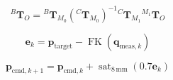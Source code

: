 \documentclass{article}
\begin{document}
\[
{}^{B}\mathbf{T}_{O} = {}^{B}\mathbf{T}_{M_0}\left({}^{C}\mathbf{T}_{M_0}\right)^{-1}{}^{C}\mathbf{T}_{M_1}{}^{M_1}\mathbf{T}_{O}
\]

\[
\mathbf{e}_k = \mathbf{p}_{\mathrm{target}} - \operatorname{FK}(\mathbf{q}_{\mathrm{meas},k})
\]

\[
\mathbf{p}_{\mathrm{cmd},k+1}=\mathbf{p}_{\mathrm{cmd},k}+\operatorname{sat}_{8\,\mathrm{mm}}(0.7\mathbf{e}_k)
\]
\end{document}
